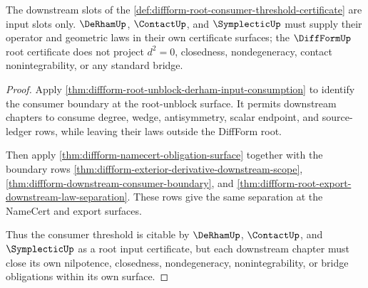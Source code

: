 \begin{theorem}
\label{thm:diffform-root-consumer-downstream-law-separation}
The downstream slots of the
\autoref{def:diffform-root-consumer-threshold-certificate} are input slots
only. $\DeRhamUp$, $\ContactUp$, and $\SymplecticUp$ must supply their
operator and geometric laws in their own certificate surfaces; the
$\DiffFormUp$ root certificate does not project $d^2=0$, closedness,
nondegeneracy, contact nonintegrability, or any standard bridge.
\end{theorem}
\begin{proof}
Apply
\autoref{thm:diffform-root-unblock-derham-input-consumption} to identify the
consumer boundary at the root-unblock surface. It permits downstream chapters
to consume degree, wedge, antisymmetry, scalar endpoint, and source-ledger
rows, while leaving their laws outside the DiffForm root.

Then apply \autoref{thm:diffform-namecert-obligation-surface} together with
the boundary rows
\autoref{thm:diffform-exterior-derivative-downstream-scope},
\autoref{thm:diffform-downstream-consumer-boundary}, and
\autoref{thm:diffform-root-export-downstream-law-separation}. These rows give
the same separation at the NameCert and export surfaces.

Thus the consumer threshold is citable by $\DeRhamUp$, $\ContactUp$, and
$\SymplecticUp$ as a root input certificate, but each downstream chapter must
close its own nilpotence, closedness, nondegeneracy, nonintegrability, or
bridge obligations within its own surface.
\end{proof}
